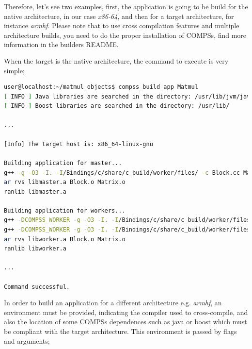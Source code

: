 Therefore, let's see two examples, first, the application is going to be build for the native architecture, in our case {\it x86-64}, and then for a target architecture, for instance {\it armhf}. Please note that to use cross compilation features and multiple architecture builds, you need to do the proper installation of COMPSs, find more information in the builders README.

When the target is the native architecture, the command to execute is very simple;

\begin{lstlisting}[language=bash]
user@localhost:~/matmul_objects$ compss_build_app Matmul
[ INFO ] Java libraries are searched in the directory: /usr/lib/jvm/java-1.8.0-openjdk-amd64//jre/lib/amd64/server
[ INFO ] Boost libraries are searched in the directory: /usr/lib/

...

[Info] The target host is: x86_64-linux-gnu

Building application for master...
g++ -g -O3 -I. -I/Bindings/c/share/c_build/worker/files/ -c Block.cc Matrix.cc 
ar rvs libmaster.a Block.o Matrix.o
ranlib libmaster.a

Building application for workers...
g++ -DCOMPSS_WORKER -g -O3 -I. -I/Bindings/c/share/c_build/worker/files/ -c Block.cc -o Block.o
g++ -DCOMPSS_WORKER -g -O3 -I. -I/Bindings/c/share/c_build/worker/files/ -c Matrix.cc -o Matrix.o
ar rvs libworker.a Block.o Matrix.o 
ranlib libworker.a

... 

Command successful.

\end{lstlisting}

In order to build an application for a different architecture e.g. {\it armhf}, an environment must be provided, indicating the compiler used to cross-compile, and also the location of some COMPSs dependences such as java or boost which must be compliant with the target architecture. This environment is passed by flags and arguments;

